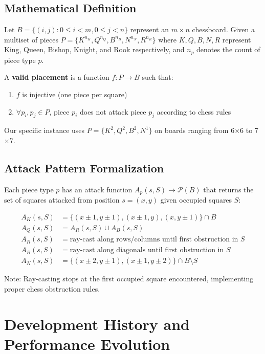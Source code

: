 \documentclass[12pt,a4paper]{article}
\theoremstyle{definition}
\begin{document}
\subsection{Mathematical Definition}

Let $B = \{(i,j) : 0 \leq i < m, 0 \leq j < n\}$ represent an $m \times n$ chessboard. Given a multiset of pieces $P = \{K^{n_K}, Q^{n_Q}, B^{n_B}, N^{n_N}, R^{n_R}\}$ where $K, Q, B, N, R$ represent King, Queen, Bishop, Knight, and Rook respectively, and $n_p$ denotes the count of piece type $p$.

A \textbf{valid placement} is a function $f: P \rightarrow B$ such that:
\begin{enumerate}
\item $f$ is injective (one piece per square)
\item $\forall p_i, p_j \in P$, piece $p_i$ does not attack piece $p_j$ according to chess rules
\end{enumerate}

Our specific instance uses $P = \{K^2, Q^2, B^2, N^1\}$ on boards ranging from 6$\times$6 to 7$\times$7.

\subsection{Attack Pattern Formalization}

Each piece type $p$ has an attack function $A_p(s, S) \rightarrow \mathcal{P}(B)$ that returns the set of squares attacked from position $s=(x,y)$ given occupied squares $S$:

\begin{align}
A_K(s, S) &= \{(x \pm 1, y \pm 1), (x \pm 1, y), (x, y \pm 1)\} \cap B \\
A_Q(s, S) &= A_R(s, S) \cup A_B(s, S) \\
A_R(s, S) &= \text{ray-cast along rows/columns until first obstruction in } S \\
A_B(s, S) &= \text{ray-cast along diagonals until first obstruction in } S \\
A_N(s, S) &= \{(x \pm 2, y \pm 1), (x \pm 1, y \pm 2)\} \cap B \setminus S
\end{align}

Note: Ray-casting stops at the first occupied square encountered, implementing proper chess obstruction rules.

\section{Development History and Performance Evolution}
\end{document}

